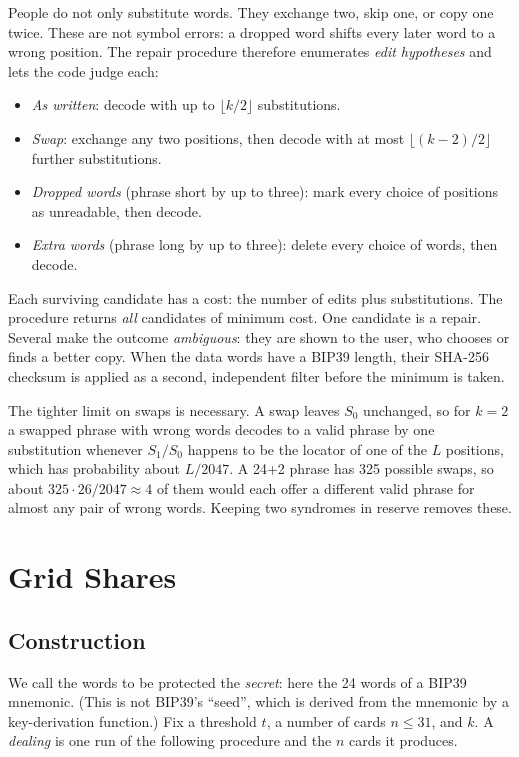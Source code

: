 \documentclass[numeric]{anvil-paper}
\begin{document}
People do not only substitute words. They exchange two, skip one, or copy one
twice. These are not symbol errors: a dropped word shifts every later word to a
wrong position. The repair procedure therefore enumerates \emph{edit
hypotheses} and lets the code judge each:
\begin{itemize}
\item \emph{As written}: decode with up to $\lfloor k/2\rfloor$ substitutions.
\item \emph{Swap}: exchange any two positions, then decode with at most
  $\lfloor (k-2)/2\rfloor$ further substitutions.
\item \emph{Dropped words} (phrase short by up to three): mark every choice of
  positions as unreadable, then decode.
\item \emph{Extra words} (phrase long by up to three): delete every choice of
  words, then decode.
\end{itemize}
Each surviving candidate has a cost: the number of edits plus substitutions.
The procedure returns \emph{all} candidates of minimum cost. One candidate is a
repair. Several make the outcome \emph{ambiguous}: they are shown to the user,
who chooses or finds a better copy. When the data words have a BIP39 length,
their SHA-256 checksum is applied as a second, independent filter before the
minimum is taken.

The tighter limit on swaps is necessary. A swap leaves $S_0$ unchanged, so for
$k=2$ a swapped phrase with wrong words decodes to a valid phrase by one
substitution whenever $S_1/S_0$ happens to be the locator of one of the $L$
positions, which has probability about $L/2047$. A 24+2 phrase has 325 possible
swaps, so about $325\cdot 26/2047\approx 4$ of them would each offer a different
valid phrase for almost any pair of wrong words. Keeping two syndromes in
reserve removes these.

\section{Grid Shares}
\label{sec:grid}

\subsection{Construction}

We call the words to be protected the \emph{secret}: here the 24 words of a
BIP39 mnemonic. (This is not BIP39's ``seed'', which is derived from the
mnemonic by a key-derivation function.) Fix a threshold $t$, a number of cards
$n\le 31$, and $k$. A \emph{dealing} is one run of the following procedure and
the $n$ cards it produces.
\end{document}
